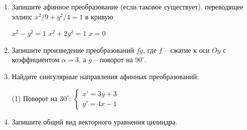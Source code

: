 \begin{enumerate}
\item Запишите афинное преобразование (если таковое существует), переводящее эллипс $x^2/9 + y^2/4 = 1$ в кривую
\begin{tasks}
\task $x^2 - y^2 = 1$
\vspace{1cm}
\task $x^2 + 2y^2 = 1$
\vspace{1cm}
\task $x = 0$
\vspace{1cm}
\end{tasks}
\item Запишите произведение преобразований $fg$, где $f$ -- сжатие к оси $Oy$ с коэффициентом $\alpha = 3$, а $g$ -- поворот на $90^\circ$.
\vspace{3cm}
\item Найдите сингулярные направления афинных преобразований:
\begin{tasks}[after-item-skip=2cm](1)
\task Поворот на $30^\circ$:
\task $\begin{cases}
	x' = 3y+3\\
	y' = 4x - 1
\end{cases}$
\end{tasks}
\vspace{2cm}
\item Запишите общий вид векторного уравнения цилиндра.
\vspace{3cm}



\end{enumerate}
